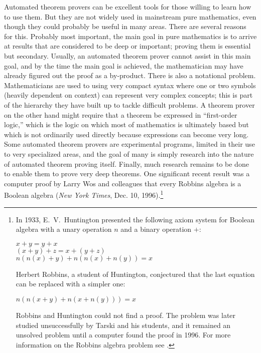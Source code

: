 Automated theorem provers can be excellent tools for those willing to learn
how to use them.  But they are not widely used in mainstream pure
mathematics, even though they could probably be useful in many areas.  There
are several reasons for this.  Probably most important, the main goal in pure
mathematics is to arrive at results that are considered to be deep or
important; proving them is essential but secondary.  Usually, an automated
theorem prover cannot assist in this main goal, and by the time the main goal
is achieved, the mathematician may have already figured out the proof as a
by-product.  There is also a notational problem.  Mathematicians are used to
using very compact syntax where one or two symbols (heavily dependent on
context) can represent very complex concepts; this is part of the
hierarchy they have built up to tackle difficult problems.  A
theorem prover on the other hand might require that a theorem be expressed in
``first-order logic,'' which is the logic on which
most of mathematics is ultimately based but which is not ordinarily used
directly because expressions can become very long.  Some automated theorem
provers are experimental programs, limited in their use to very specialized
areas, and the goal of many is simply research into the nature of automated
theorem proving itself.  Finally, much research remains to be done to enable
them to prove very deep theorems.  One significant recent result was a
computer proof by Larry Wos and colleagues that every Robbins
algebra is a Boolean  algebra
({\em New York Times}, Dec. 10, 1996).\footnote{In 1933, E.~V.\
Huntington
presented the following axiom system for
Boolean algebra with a unary operation $n$ and a binary operation $+$:
\begin{center}
    $x + y = y + x$ \\
    $(x + y) + z = x + (y + z)$ \\
    $n(n(x) + y) + n(n(x) + n(y)) = x$
\end{center}
Herbert Robbins, a student of Huntington, conjectured
that the last equation can be replaced with a simpler one:
\begin{center}
    $n(n(x + y) + n(x + n(y))) = x$
\end{center}
Robbins and Huntington could not find a proof.  The problem was
later studied unsuccessfully by Tarski and his
students, and it remained an unsolved problem until a
computer found the proof in 1996.  For more information on
the Robbins algebra problem see \cite{Wos}.}

